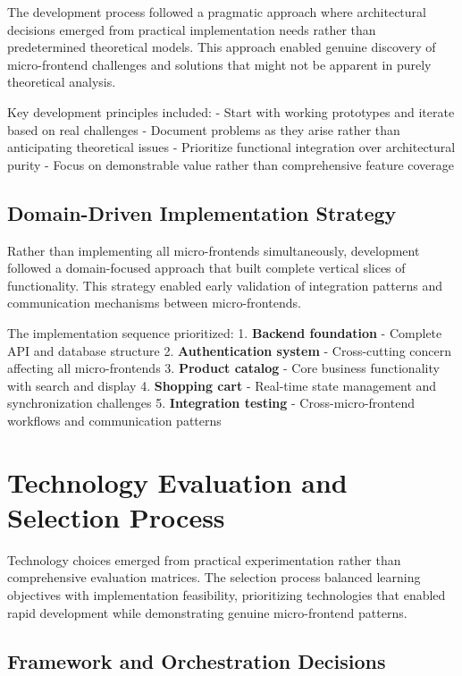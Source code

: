 \documentclass[12pt,a4paper]{report}
\begin{document}
The development process followed a pragmatic approach where architectural decisions emerged from practical implementation needs rather than predetermined theoretical models. This approach enabled genuine discovery of micro-frontend challenges and solutions that might not be apparent in purely theoretical analysis.

Key development principles included:
- Start with working prototypes and iterate based on real challenges
- Document problems as they arise rather than anticipating theoretical issues  
- Prioritize functional integration over architectural purity
- Focus on demonstrable value rather than comprehensive feature coverage

\subsection{Domain-Driven Implementation Strategy}

Rather than implementing all micro-frontends simultaneously, development followed a domain-focused approach that built complete vertical slices of functionality. This strategy enabled early validation of integration patterns and communication mechanisms between micro-frontends.

The implementation sequence prioritized:
1. \textbf{Backend foundation} - Complete API and database structure
2. \textbf{Authentication system} - Cross-cutting concern affecting all micro-frontends
3. \textbf{Product catalog} - Core business functionality with search and display
4. \textbf{Shopping cart} - Real-time state management and synchronization challenges
5. \textbf{Integration testing} - Cross-micro-frontend workflows and communication patterns

\section{Technology Evaluation and Selection Process}

Technology choices emerged from practical experimentation rather than comprehensive evaluation matrices. The selection process balanced learning objectives with implementation feasibility, prioritizing technologies that enabled rapid development while demonstrating genuine micro-frontend patterns.

\subsection{Framework and Orchestration Decisions}
\end{document}
